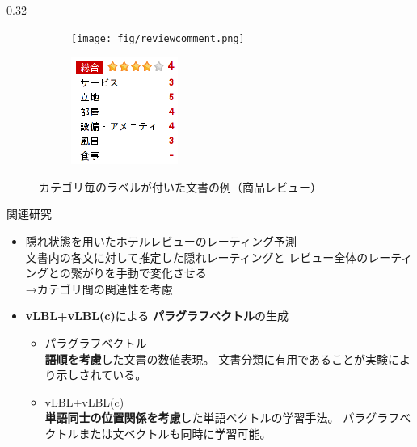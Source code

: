 \documentclass[8pt,unicode]{beamer}
\newcommand{\columnscale}{0.32}
\newcommand{\arrow}{{\color{ttiblue} →}\hspace{1ex}}
\newcommand{\good}[1]{\textbf{\color{orange} #1}}
\newcommand{\keyword}[1]{\textbf{\color{red} #1}}
\begin{document}
\begin{frame}{}
\begin{columns}[t]
\begin{column}{\columnscale\textwidth}
  \begin{figure}
    \begin{subfigure}{0.52\textwidth}
      \texttt{[image: fig/reviewcomment.png]}
    \end{subfigure}
    \begin{subfigure}{0.32\textwidth}
      \includegraphics[width=\textwidth]{fig/reviewpoints.png}
    \end{subfigure}
    \caption{カテゴリ毎のラベルが付いた文書の例（商品レビュー）}
  \end{figure}

  \begin{block}{関連研究}
    \begin{itemize}
      \item 隠れ状態を用いたホテルレビューのレーティング予測 \\
        文書内の各文に対して推定した隠れレーティングと
        レビュー全体のレーティングとの繋がりを手動で変化させる \\
        \arrow カテゴリ間の関連性を考慮
      \item \keyword{vLBL+vLBL(c)}による\keyword{パラグラフベクトル}の生成 \\
        \begin{itemize}
          \item {\normalsize パラグラフベクトル} \\
            \good{語順を考慮}した文書の数値表現。
            文書分類に有用であることが実験により示しされている。
          \item {\normalsize vLBL+vLBL(c)} \\
            \good{単語同士の位置関係を考慮}した単語ベクトルの学習手法。
            パラグラフベクトルまたは文ベクトルも同時に学習可能。
        \end{itemize}
    \end{itemize}
  \end{block}


\end{column}
\end{columns}
\end{frame}
\end{document}
